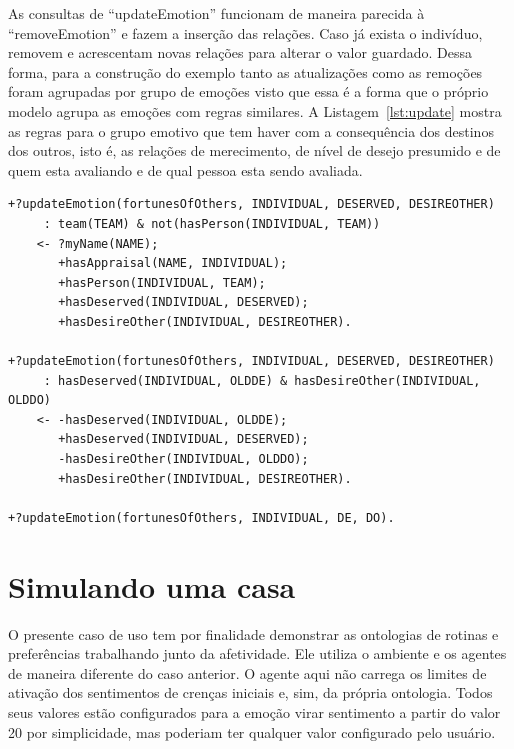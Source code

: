 As consultas de ``updateEmotion'' funcionam de maneira parecida à
``removeEmotion'' e fazem a inserção das relações. Caso já exista o
indivíduo, removem e acrescentam novas relações para alterar o valor guardado.
Dessa forma, para a construção do exemplo tanto as atualizações como as
remoções foram agrupadas por grupo de emoções visto que essa é a forma que
o próprio modelo \occ agrupa as emoções com regras similares. A Listagem~\ref{lst:update}
mostra as regras para o grupo emotivo que tem haver com a consequência dos
destinos dos outros, isto é, as relações de merecimento, de nível de
desejo presumido e de quem esta avaliando e de qual pessoa esta sendo
avaliada.

\begin{center}
    \begin{minipage}{130mm}
	\lstset{linewidth=130mm}
	\begin{lstlisting}[frame=trbl,
caption=Amostra de código referente as atualizações de emoções do tipo destino de outros,
label=lst:update]
+?updateEmotion(fortunesOfOthers, INDIVIDUAL, DESERVED, DESIREOTHER)
     : team(TEAM) & not(hasPerson(INDIVIDUAL, TEAM))
    <- ?myName(NAME);
       +hasAppraisal(NAME, INDIVIDUAL);
       +hasPerson(INDIVIDUAL, TEAM);
       +hasDeserved(INDIVIDUAL, DESERVED);
       +hasDesireOther(INDIVIDUAL, DESIREOTHER).

+?updateEmotion(fortunesOfOthers, INDIVIDUAL, DESERVED, DESIREOTHER)
     : hasDeserved(INDIVIDUAL, OLDDE) & hasDesireOther(INDIVIDUAL, OLDDO)
    <- -hasDeserved(INDIVIDUAL, OLDDE);
       +hasDeserved(INDIVIDUAL, DESERVED);
       -hasDesireOther(INDIVIDUAL, OLDDO);
       +hasDesireOther(INDIVIDUAL, DESIREOTHER).

+?updateEmotion(fortunesOfOthers, INDIVIDUAL, DE, DO).
	\end{lstlisting}
    \end{minipage}
\end{center}

\section{Simulando uma casa} \label{ch:cdu:home}

O presente caso de uso tem por finalidade demonstrar as ontologias de rotinas
e preferências trabalhando junto da afetividade. Ele utiliza o ambiente e os
agentes de maneira diferente do caso anterior. O agente aqui não carrega os
limites de ativação dos sentimentos de crenças iniciais e, sim, da própria
ontologia. Todos seus valores estão configurados para a emoção virar
sentimento a partir do valor 20\label{mark:emo} por simplicidade, mas poderiam ter qualquer
valor configurado pelo usuário.

